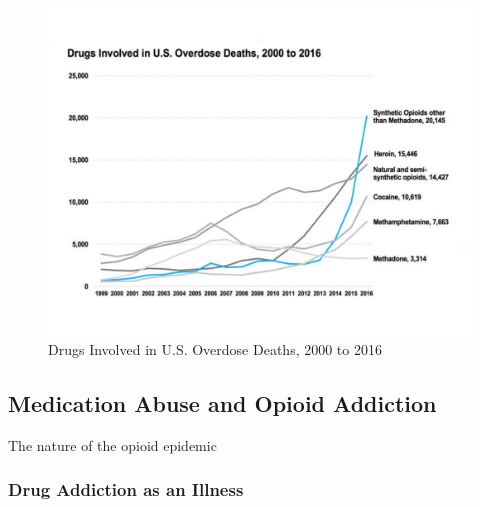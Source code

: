 \documentclass[sigconf]{acmart}
\begin{document}
\begin{figure}[!ht]
  \centering\includegraphics[width=\columnwidth]{images/Figure1.pdf}
  \caption{Drugs Involved in U.S. Overdose Deaths, 2000 to 2016 \cite{nida17}
  }\label{f:Figure1}
\end{figure}


\subsection{Medication Abuse and Opioid Addiction} \cite{Varshney14}

The nature of the opioid epidemic \cite{volkow14}



\subsubsection{Drug Addiction as an Illness}
\end{document}
